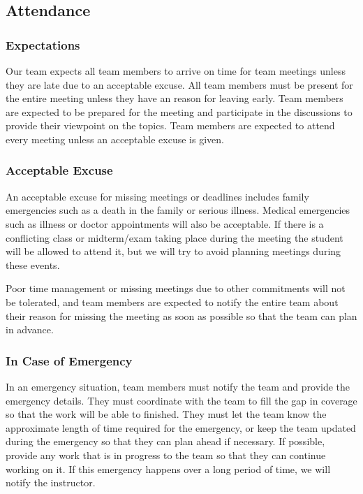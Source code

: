 \documentclass{article}
\begin{document}
\subsection*{Attendance}

\subsubsection*{Expectations}

Our team expects all team members to arrive on time for team meetings unless they are late due to an acceptable excuse. All team members must be present for the entire meeting unless they have an reason for leaving early. 
Team members are expected to be prepared for the meeting and participate in the discussions to provide their viewpoint on the topics. Team members are expected to attend every meeting unless an acceptable excuse is given.

\subsubsection*{Acceptable Excuse}

An acceptable excuse for missing meetings or deadlines includes family emergencies such as a death in the family or serious illness. Medical emergencies such as illness or doctor appointments will also be acceptable. 
If there is a conflicting class or midterm/exam taking place during the meeting the student will be allowed to attend it, but we will try to avoid planning meetings during these events. 

Poor time management or missing meetings due to other commitments will not be tolerated, and team members are expected to notify the entire team about their reason for missing the meeting as soon as possible so that the team can plan in advance.

\subsubsection*{In Case of Emergency}

In an emergency situation, team members must notify the team and provide the emergency details. They must coordinate with the team to fill the gap in coverage so that the work will be able to finished.
They must let the team know the approximate length of time required for the emergency, or keep the team updated during the emergency so that they can plan ahead if necessary. If possible, provide any work 
that is in progress to the team so that they can continue working on it. If this emergency happens over a long period of time, we will notify the instructor.
\end{document}
